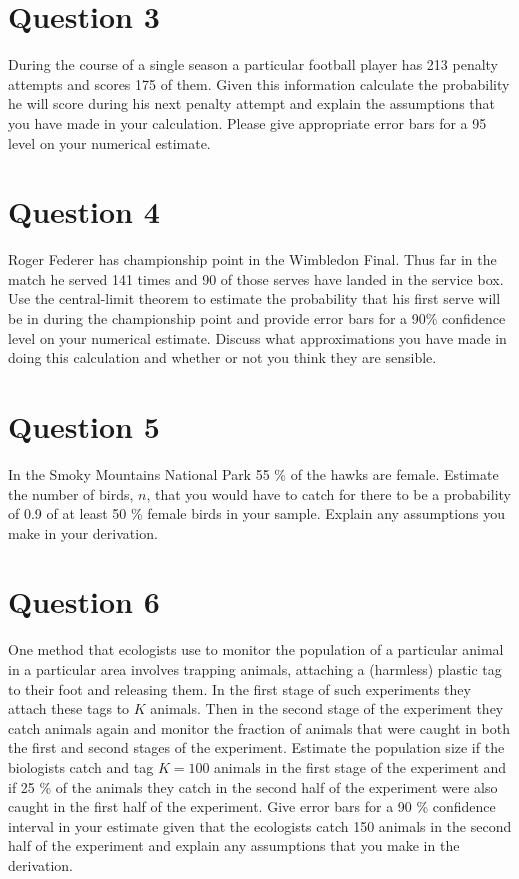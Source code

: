 \documentclass[a4paper]{article}
\begin{document}
\section{Question 3}

During the course of a single season a particular football player has 213 penalty attempts and scores 175 of them.
Given this information calculate the probability he will score during his next penalty attempt and explain the
assumptions that you have made in your calculation. Please give appropriate error bars for a 95 %
level on your numerical estimate.


\section{Question 4}

Roger Federer has championship point in the Wimbledon Final. Thus far in the match he served 141 times and  90 of those serves have
       landed in the service box. Use the central-limit theorem to estimate the probability that his first serve will be in during the championship point and
       provide error bars for a 90\% confidence level on your numerical estimate.  Discuss what approximations you have made in doing this calculation and whether or not you
       think they are sensible.
       
\section{Question 5}

In the Smoky Mountains National Park 55 \% of the hawks are female.  Estimate the number of birds, $n$, that you would have to catch for there to be
a probability of 0.9 of at least 50 \% female birds in your sample.  Explain any assumptions you make in your derivation.

\section{Question 6}

One method that ecologists use to monitor the population of a particular animal in a particular area involves trapping animals, attaching a (harmless) plastic tag to their foot and
releasing them.  In the first stage of such experiments they attach these tags to $K$ animals.  Then in the second stage of the experiment they catch animals again and monitor the fraction of
animals that were caught in both the first and second stages of the experiment.  Estimate the population size if the biologists catch and tag $K=100$ animals in the first stage of the experiment and
if 25
\% of the animals they catch in the second half of the experiment were also caught in the first half of the experiment.  Give error bars for a 90 \% confidence interval in your estimate given that
the ecologists catch 150 animals in the second half of the experiment and explain any assumptions that you make in the derivation.
\end{document}
